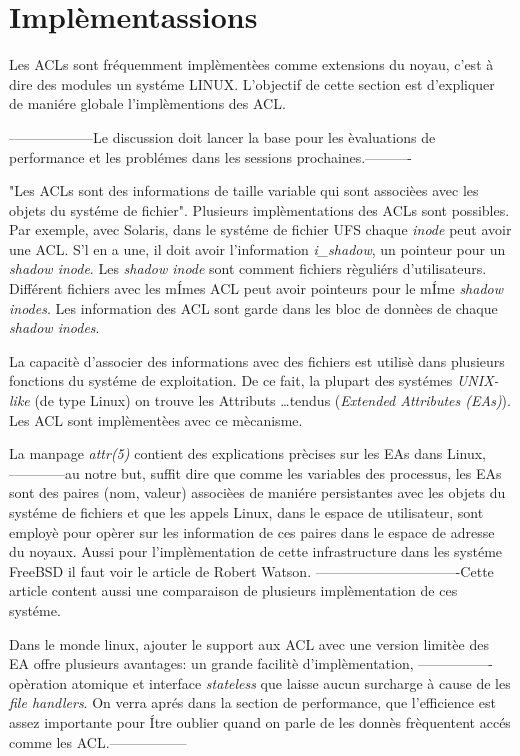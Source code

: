 \section{Implèmentassions}
 
Les ACLs sont fréquemment implèmentèes comme extensions du noyau, c'est à dire des modules un systéme LINUX. L'objectif de cette section est d'expliquer de maniére globale l'implèmentions des ACL. 

------------------Le discussion doit lancer la base pour les èvaluations de performance et les problémes dans les sessions prochaines.----------
 
"Les ACLs sont des informations de taille variable qui sont associèes avec les objets du systéme de fichier"\cite{aclsuse}. Plusieurs implèmentations des ACLs sont possibles. Par exemple, avec Solaris, dans le systéme de fichier UFS\cite{acl_permission} chaque \emph{inode} peut avoir une ACL. S'l en a une, il doit avoir l'information \emph{i\_shadow}, un pointeur pour un \emph{shadow inode}. Les \emph{shadow inode} sont comment fichiers règuliérs d'utilisateurs. Différent fichiers avec les mÍmes ACL peut avoir pointeurs pour le mÍme \emph{shadow inodes}. Les information des ACL sont garde dans les bloc de donnèes de chaque \emph{shadow inodes}.
 
La capacitè d'associer des informations avec des fichiers est utilisè dans plusieurs fonctions du systéme de exploitation. De ce fait, la plupart des systémes \emph{UNIX-like} (de type Linux) on trouve les Attributs …tendus (\emph{Extended Attributes (EAs)}). Les ACL sont implèmentèes avec ce mècanisme.

La manpage \cite{aclsuse} \emph{attr(5)} contient des explications prècises sur les EAs dans Linux, ------------au notre but, suffit dire que comme les variables des processus, les EAs sont des paires (nom, valeur) associèes de maniére persistantes avec les objets du systéme de fichiers et que les appels Linux, dans le espace de utilisateur, sont employè pour opèrer sur les information de ces paires dans le espace de adresse du noyaux. Aussi pour l'implèmentation de cette infrastructure dans les systéme FreeBSD il faut voir le article de Robert Watson\cite{trust}. -------------------------------Cette article content aussi une comparaison de plusieurs implèmentation de ces systéme.
 
Dans le monde linux, ajouter le support aux ACL avec une version limitèe des EA offre plusieurs avantages: un grande facilitè d'implèmentation, ----------------opèration atomique et interface \emph{stateless} que laisse aucun surcharge à cause de les \emph{file handlers}. On verra aprés dans la section de performance, que l'efficience est assez importante pour Ítre oublier quand on parle de les donnès frèquentent accés comme les ACL.-----------------
 
